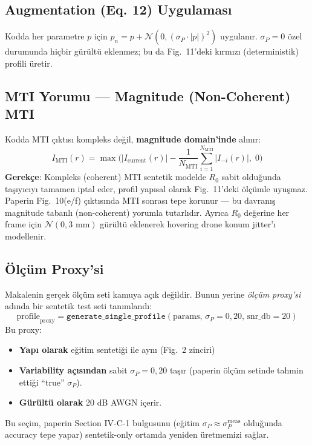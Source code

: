 \documentclass[11pt,a4paper]{article}
\begin{document}
\subsection{Augmentation (Eq. 12) Uygulaması}
Kodda her parametre $p$ için $p_n = p + \mathcal{N}(0, (\sigma_P\cdot|p|)^2)$ uygulanır.
$\sigma_P = 0$ özel durumunda hiçbir gürültü eklenmez; bu da Fig.~11'deki kırmızı (deterministik)
profili üretir.

\subsection{MTI Yorumu — Magnitude (Non-Coherent) MTI}
Kodda MTI çıktısı kompleks değil, \textbf{magnitude domain'inde} alınır:
\begin{equation*}
I_{\text{MTI}}(r) = \max\!\big( |I_{\text{current}}(r)| - \frac{1}{N_{\text{MTI}}}\sum_{i=1}^{N_{\text{MTI}}} |I_{-i}(r)|,\; 0 \big)
\end{equation*}
\textbf{Gerekçe}: Kompleks (coherent) MTI sentetik modelde $R_0$ sabit olduğunda taşıyıcıyı
tamamen iptal eder, profil yapısal olarak Fig.~11'deki ölçümle uyuşmaz. Paperin Fig.~10(e/f)
çıktısında MTI sonrası tepe korunur — bu davranış magnitude tabanlı (non-coherent) yorumla
tutarlıdır. Ayrıca $R_0$ değerine her frame için $\mathcal{N}(0, 3 \text{ mm})$ gürültü eklenerek
hovering drone konum jitter'ı modellenir.

\subsection{Ölçüm Proxy'si}
Makalenin gerçek ölçüm seti kamuya açık değildir. Bunun yerine \emph{ölçüm proxy'si} adında bir
sentetik test seti tanımlandı:
\begin{equation*}
\text{profile}_{\text{proxy}} = \texttt{generate\_single\_profile}(\text{params},\, \sigma_P=0{,}20,\, \text{snr\_db}=20)
\end{equation*}
Bu proxy:
\begin{itemize}
    \item \textbf{Yapı olarak} eğitim sentetiği ile aynı (Fig.~2 zinciri)
    \item \textbf{Variability açısından} sabit $\sigma_P=0{,}20$ taşır (paperin ölçüm setinde
          tahmin ettiği ``true'' $\sigma_P$).
    \item \textbf{Gürültü olarak} 20 dB AWGN içerir.
\end{itemize}
Bu seçim, paperin Section IV-C-1 bulgusunu (eğitim $\sigma_P \approx \sigma_P^{\text{meas}}$
olduğunda accuracy tepe yapar) sentetik-only ortamda yeniden üretmemizi sağlar.
\end{document}
